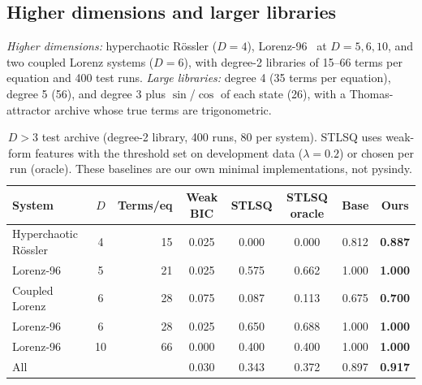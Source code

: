\subsection{Higher dimensions and larger libraries}
\label{sec:nd}
\label{sec:biglib}
\emph{Higher dimensions:} hyperchaotic R\"ossler ($D=4$), Lorenz-96~\citep{lorenz1996predictability} at $D=5,6,10$, and two coupled Lorenz systems ($D=6$), with degree-2 libraries of 15--66 terms per equation and 400 test runs. \emph{Large libraries:} degree 4 (35 terms per equation), degree 5 (56), and degree 3 plus $\sin$/$\cos$ of each state (26), with a Thomas-attractor archive whose true terms are trigonometric.

\begin{table}[t]
\centering
\caption{$D>3$ test archive (degree-2 library, 400 runs, 80 per system). STLSQ uses weak-form features with the threshold set on development data ($\lambda=0.2$) or chosen per run (oracle). These baselines are our own minimal implementations, not pysindy.}
\label{tab:nd}
\small
\begin{tabular}{@{}lcrccccc@{}}
\toprule
System & $D$ & Terms/eq & Weak BIC & STLSQ & STLSQ oracle & Base & \textbf{Ours} \\
\midrule
Hyperchaotic R\"ossler & 4 & 15 & 0.025 & 0.000 & 0.000 & 0.812 & \textbf{0.887} \\
Lorenz-96 & 5 & 21 & 0.025 & 0.575 & 0.662 & 1.000 & \textbf{1.000} \\
Coupled Lorenz & 6 & 28 & 0.075 & 0.087 & 0.113 & 0.675 & \textbf{0.700} \\
Lorenz-96 & 6 & 28 & 0.025 & 0.650 & 0.688 & 1.000 & \textbf{1.000} \\
Lorenz-96 & 10 & 66 & 0.000 & 0.400 & 0.400 & 1.000 & \textbf{1.000} \\
\midrule
All & & & 0.030 & 0.343 & 0.372 & 0.897 & \textbf{0.917} \\
\bottomrule
\end{tabular}
\end{table}

